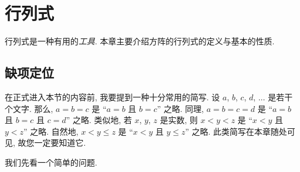 \chapter{行列式}

行列式是一种有用的\emph{工具}.
本章主要介绍方阵的行列式的定义与基本的性质.

\clearpage

\section{缺项定位}

在正式进入本节的内容前,
我要提到一种十分常用的简写.
设 \(a\), \(b\), \(c\), \(d\), \(\dots\) 是若干个文字.
那么, \(a = b = c\) 是
``\(a = b\) 且 \(b = c\)'' 之略.
同理, \(a = b = c = d\) 是
``\(a = b\) 且 \(b = c\) 且 \(c = d\)'' 之略.
类似地, 若 \(x\), \(y\), \(z\) 是实数,
则 \(x < y < z\) 是
``\(x < y\) 且 \(y < z\)'' 之略.
自然地, \(x < y \leq z\) 是
``\(x < y\) 且 \(y \leq z\)'' 之略.
此类简写在本章随处可见,
故您一定要知道它.

\vspace{2ex}

我们先看一个简单的问题.

